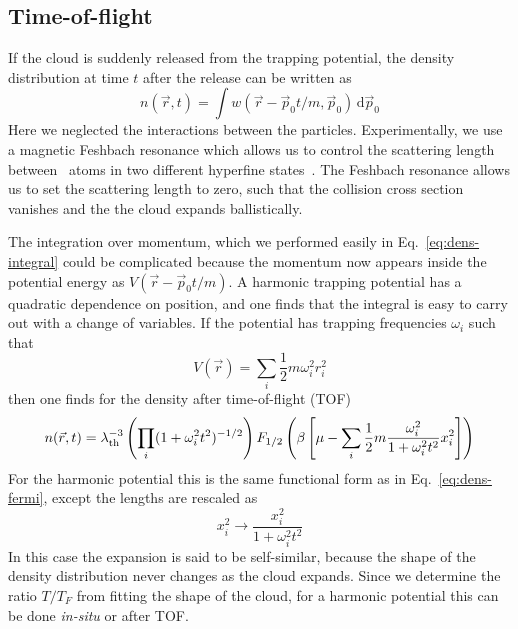 \subsection{Time-of-flight}

If the cloud is suddenly released from the trapping potential, the density
distribution at time $t$ after the release can be written as
\begin{equation}
  n(\vec{r},t) = 
     \int w(\vec{r} - \vec{p}_{0}t/m,\vec{p}_{0} )\,\mathrm{d} \vec{p}_{0}
\end{equation}
Here we neglected the interactions between the particles.  Experimentally, we
use a magnetic Feshbach resonance which allows us to control the scattering
length between \li\ atoms in two different hyperfine
states~\cite{Houbiers1998}.  The Feshbach resonance allows us to set the
scattering length to zero, such that the collision cross section vanishes and
the the cloud expands ballistically. 

The integration over momentum, which we performed easily in
Eq.~\ref{eq:dens-integral} could be complicated because the momentum now
appears inside the potential energy as  $V(\vec{r}-\vec{p}_{0} t/m)$.   A
harmonic trapping potential has a quadratic dependence on position, and one
finds that the integral is easy to carry out with a change of variables.  If
the potential has trapping frequencies $\omega_{i}$ such that  
\begin{equation} 
 V(\vec{r}) =  \sum_{i} \frac{1}{2} m \omega_{i}^{2} r_{i}^{2} 
\end{equation}
then one finds for the density after time-of-flight (TOF) 
\begin{equation}
  n(\vec{r},t) = 
   \lambda_{\mathrm{th}} ^{-3} \left(\prod_{i} (1 + \omega_{i}^{2}t^{2})^{-1/2} \right) 
   F_{1/2}\left( \beta\left[ \mu -
   \sum_{i}\frac{1}{2} m \frac{\omega_{i}^{2}}{1+ \omega_{i}^{2} t^{2}} 
     x_{i}^{2} \right] \right)
\label{eq:001}
\end{equation}
For the harmonic potential this is the same functional form as in
Eq.~\ref{eq:dens-fermi}, except the lengths are rescaled as 
\begin{equation}
  x_{i}^{2}  \rightarrow  \frac{ x_{i}^{2}}  {1+ \omega_{i}^{2} t^{2}}
\end{equation} 
In this case the expansion is said to be self-similar, because the shape of the
density distribution never changes as the cloud expands.   Since we determine
the ratio $T/T_{F}$ from fitting the shape of the cloud,  for a harmonic
potential this can be done \textit{in-situ} or after TOF.  

